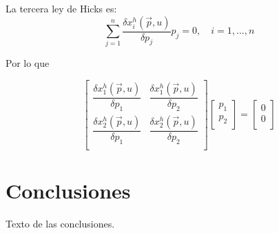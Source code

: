 \documentclass[utf8, twoside,]{article}
\begin{document}
\begin{otherlanguage}{spanish}
   La tercera ley de Hicks es:
   \begin{equation*}
      \sum_{j=1}^n \dfrac{\delta x_i^h(\vec{p}, u)}{\delta p_j} p_j = 0, \quad i=1,\dots,n
  \end{equation*}
  
  Por lo que
  
      \begin{equation*}
    \begin{bmatrix}
 \dfrac{\delta x_1^h(\vec{p}, u)}{\delta p_1} 
 & \dfrac{\delta x_1^h(\vec{p}, u)}{\delta p_2} \\[2ex]
 \dfrac{\delta x_2^h(\vec{p}, u)}{\delta p_1} 
 & \dfrac{\delta x_2^h(\vec{p}, u)}{\delta p_2} \\[2ex]
 \end{bmatrix}
 \begin{bmatrix}
 p_1 \\[2ex]
 p_2 \\[2ex]
 \end{bmatrix}
 =
 \begin{bmatrix}
 0 \\[2ex]
 0 \\[2ex]
 \end{bmatrix}
\end{equation*} 
 

\section{Conclusiones}

Texto de las conclusiones.

\pagebreak



\printbibliography %
\vfill

\end{otherlanguage}
\end{document}
